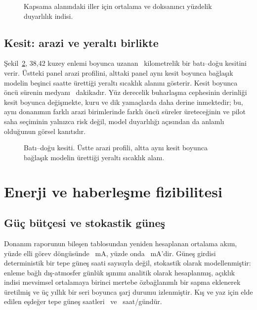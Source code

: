 \documentclass[11pt,a4paper]{article}
\begin{document}
\begin{figure}[htbp]\centering

\caption{Kapsama alanındaki iller için ortalama ve doksanıncı yüzdelik
duyarlılık indisi.}
\label{fig:geoprov}
\end{figure}

\subsection{Kesit: arazi ve yeraltı birlikte}

Şekil~\ref{fig:geosection}, 38,42 kuzey enlemi boyunca uzanan
\geoTransLen~kilometrelik bir batı--doğu kesitini verir. Üstteki panel arazi
profilini, alttaki panel aynı kesit boyunca bağlaşık modelin beşinci saatte
ürettiği yeraltı sıcaklık alanını gösterir. Kesit boyunca öncü sürenin medyanı
\geoTransLead\ dakikadır. Yüz derecelik buharlaşma cephesinin derinliği kesit
boyunca değişmekte, kuru ve dik yamaçlarda daha derine inmektedir; bu, aynı
donanımın farklı arazi birimlerinde farklı öncü süreler üreteceğinin ve pilot
saha seçiminin yalnızca risk değil, model duyarlılığı açısından da anlamlı
olduğunun görsel kanıtıdır.

\begin{figure}[htbp]\centering

\caption{Batı--doğu kesiti. Üstte arazi profili, altta aynı kesit boyunca
bağlaşık modelin ürettiği yeraltı sıcaklık alanı.}
\label{fig:geosection}
\end{figure}

\section{Enerji ve haberleşme fizibilitesi}

\subsection{Güç bütçesi ve stokastik güneş}

Donanım raporunun bileşen tablosundan yeniden hesaplanan ortalama akım, yüzde
elli görev döngüsünde \iavgFifty~mA, yüzde onda \iavgTen~mA'dir. Güneş
girdisi deterministik bir tepe güneş saati sayısıyla değil, stokastik olarak
modellenmiştir: enleme bağlı dış-atmosfer günlük ışınımı analitik olarak
hesaplanmış, açıklık indisi mevsimsel ortalamaya birinci mertebe
özbağlanımlı bir sapma eklenerek üretilmiş ve üç yıllık bir seri boyunca şarj
durumu izlenmiştir. Kış ve yaz için elde edilen eşdeğer tepe güneş saatleri
\pshWinter\ ve \pshSummer\ saat/gündür.
\end{document}
